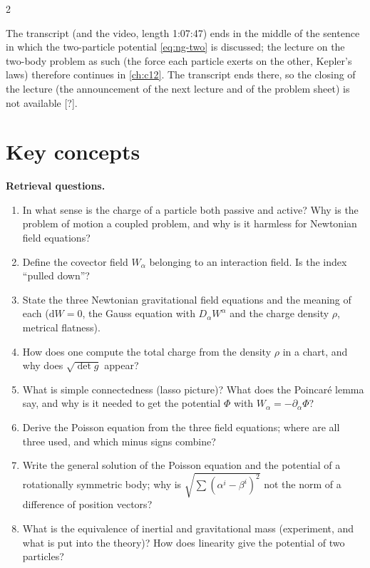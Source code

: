 \begin{paracol}{2}
\begin{coursenote}\label{cn:ng-end}
The transcript (and the video, length 1:07:47) ends in the middle of the sentence in which the two-particle potential \eqref{eq:ng-two} is discussed; the lecture on the two-body problem as such (the force each particle exerts on the other, Kepler's laws) therefore continues in \cref{ch:c12}. The transcript ends there, so the closing of the lecture (the announcement of the next lecture and of the problem sheet) is not available [?].
\end{coursenote}

\section*{Key concepts}
\begin{keyconcepts}
\textbf{Retrieval questions.}
\begin{enumerate}
  \item In what sense is the charge of a particle both passive and active? Why is the problem of motion a coupled problem, and why is it harmless for Newtonian field equations?
  \item Define the covector field $W_\alpha$ belonging to an interaction field. Is the index ``pulled down''?
  \item State the three Newtonian gravitational field equations and the meaning of each ($\mathrm dW=0$, the Gauss equation with $D_\alpha W^\alpha$ and the charge density $\rho$, metrical flatness).
  \item How does one compute the total charge from the density $\rho$ in a chart, and why does $\sqrt{\det g}$ appear?
  \item What is simple connectedness (lasso picture)? What does the Poincar\'e lemma say, and why is it needed to get the potential $\Phi$ with $W_\alpha=-\partial_\alpha\Phi$?
  \item Derive the Poisson equation from the three field equations; where are all three used, and which minus signs combine?
  \item Write the general solution of the Poisson equation and the potential of a rotationally symmetric body; why is $\sqrt{\sum(\alpha^i-\beta^i)^2}$ not the norm of a difference of position vectors?
  \item What is the equivalence of inertial and gravitational mass (experiment, and what is put into the theory)? How does linearity give the potential of two particles?

\end{enumerate}
\end{keyconcepts}
\end{paracol}
